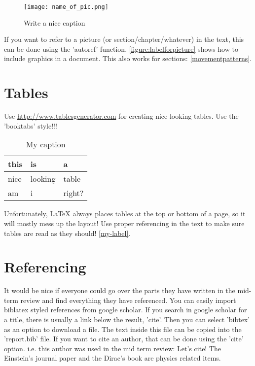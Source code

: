 \begin{figure}[H]
\centering
\texttt{[image: name\_of\_pic.png]}
\captionsetup{justification=centering}
\caption{Write a nice caption}
\label{figure:labelforpicture}
\end{figure}

If you want to refer to a picture (or section/chapter/whatever) in the text, this can be done using the 'autoref' function. \autoref{figure:labelforpicture} shows how to include graphics in a document. This also works for sections: \autoref{movementpatterns}.

\section{Tables}
Use \url{http://www.tablesgenerator.com} for creating nice looking tables. Use the 'booktabs' style!!!
\begin{table}[]
\centering
\caption{My caption}
\label{my-label}
\begin{tabular}{lll}
\hline
this & is      & a      \\ \hline
nice & looking & table  \\
am   & i       & right? \\ \hline
\end{tabular}
\end{table}
Unfortunately, LaTeX always places tables at the top or bottom of a page, so it will mostly mess up the layout! Use proper referencing in the text to make sure tables are read as they should! \autoref{my-label}.

\section{Referencing}
It would be nice if everyone could go over the parts they have written in the mid-term review and find everything they have referenced. You can easily import biblatex styled references from google scholar. If you search in google scholar for a title, there is usually a link below the result, 'cite'. Then you can select 'bibtex' as an option to download a file. The text inside this file can be copied into the 'report.bib' file. If you want to cite an author, that can be done using the 'cite' option. i.e. this author was used in the mid term review:
Let's cite! The Einstein's journal paper \cite{mautz2012indoor} and the Dirac's 
book \cite{meneses2012large} are physics related items. 





